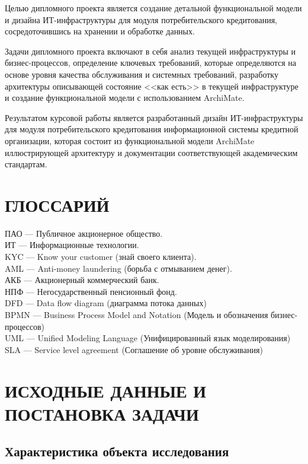 \documentclass[14pt, a4paper]{extarticle}
\begin{document}
Целью дипломного проекта является создание детальной функциональной модели и
дизайна ИТ-инфраструктуры для модуля потребительского кредитования,
сосредоточившись на хранении и обработке данных.

Задачи дипломного проекта включают в себя анализ текущей инфраструктуры и
бизнес-процессов, определение ключевых требований, которые определяются на
основе уровня качества обслуживания и системных требований, разработку
архитектуры описывающей состояние <<как есть>> в текущей инфраструктуре и
создание функциональной модели с использованием ArchiMate.

Результатом курсовой работы является разработанный дизайн ИТ-инфраструктуры для
модуля потребительского кредитования информационной системы кредитной
организации, которая состоит из функциональной модели ArchiMate иллюстрирующей
архитектуру и документации соответствующей академическим стандартам.

\section*{ГЛОССАРИЙ}
{}
\begin{raggedright}
	ПАО --- Публичное акционерное общество. \\
	ИТ --- Информационные технологии. \\
	KYC --- Know your customer (знай своего клиента). \\
	AML --- Anti-money laundering (борьба с отмыванием денег). \\
	АКБ --- Акционерный коммерческий банк. \\
	НПФ --- Негосударственный пенсионный фонд. \\
	DFD --- Data flow diagram (диаграмма потока данных) \\
	BPMN --- Business Process Model and Notation (Модель и обозначения
бизнес-процессов) \\
	UML --- Unified Modeling Language (Унифицированный язык моделирования) \\
	SLA --- Service level agreement (Соглашение об уровне обслуживания) \\
\end{raggedright}

\section{ИСХОДНЫЕ ДАННЫЕ И ПОСТАНОВКА ЗАДАЧИ}

\subsection{Характеристика объекта исследования}
\end{document}
